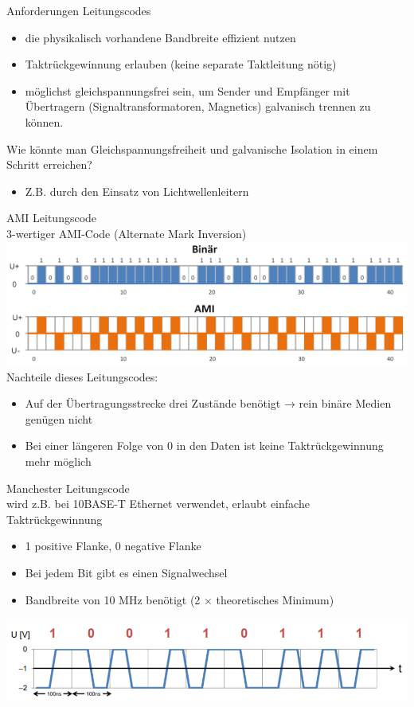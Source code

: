 \begin{theorem}{Anforderungen Leitungscodes}
\begin{itemize}
    \item die physikalisch vorhandene Bandbreite effizient nutzen
    \item Taktrückgewinnung erlauben (keine separate Taktleitung nötig)
    \item möglichst gleichspannungsfrei sein, um Sender und Empfänger mit Übertragern (Signaltransformatoren, Magnetics) galvanisch trennen zu können.
\end{itemize} 
\end{theorem}

\begin{example}
    Wie könnte man Gleichspannungsfreiheit und galvanische Isolation in einem Schritt erreichen?
    \begin{itemize}
        \item Z.B. durch den Einsatz von Lichtwellenleitern
    \end{itemize}
\end{example}

\begin{concept}{AMI Leitungscode}\\
    3-wertiger AMI-Code (Alternate Mark Inversion)\\
    \includegraphics[width=0.8\linewidth]{images/gleichspannungsfreiheit.png}\\
    Nachteile dieses Leitungscodes:
    \begin{itemize}
        \item Auf der Übertragungsstrecke drei Zustände benötigt → rein binäre Medien genügen nicht
        \item Bei einer längeren Folge von 0 in den Daten ist keine Taktrückgewinnung mehr möglich
    \end{itemize}
\end{concept}

\begin{concept}{Manchester Leitungscode}\\
    wird z.B. bei 10BASE-T Ethernet verwendet, erlaubt einfache Taktrückgewinnung
    \begin{itemize}
        \item 1 positive Flanke, 0 negative Flanke
        \item Bei jedem Bit gibt es einen Signalwechsel
        \item Bandbreite von 10 MHz benötigt (2 $\times$ theoretisches Minimum)
    \end{itemize}
    \includegraphics[width=0.6\linewidth]{images/leitungscode.png}
\end{concept}

